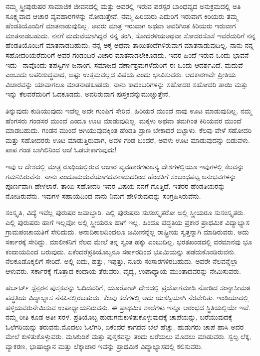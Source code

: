 ನಮ್ಮ ಸ್ತ್ರೀಪುರುಷರ ಸಾಮಾಜಿಕ ಜೀವನದಲ್ಲಿ ಮತ್ತು ಅವರಲ್ಲಿ ಇರುವ ಪರಸ್ಪರ ಬಾಂಧವ್ಯದ ಅನುಕ್ರಮದಲ್ಲಿ ಅತಿ ಸೂಕ್ಷ್ಮವಾದ ಆಚಾರ ವ್ಯವಹಾರಗಳನ್ನು ನೋಡುತ್ತೇವೆ. ನಮ್ಮ ಹಿರಿಯರು ಎದುರಿಗೆ ಇರುವಾಗ ಕಿರಿಯರು ತಮ್ಮ ಹೆಂಡತಿಯೊಂದಿಗೆ ಮಾತನಾಡುವುದಿಲ್ಲ. ಅವರು ಮಾತ್ರ ಇರುವಾಗ ಅಥವಾ ಅವರಿಗಿಂತ ಕಿರಿಯರು ಇರುವಾಗ ಮಾತನಾಡಬಹುದು. ನನಗೆ ಮದುವೆಯಾಗಿದ್ದರೆ ನನ್ನ ತಂಗಿ, ಸೋದರಳಿಯ\break ಅಥವಾ ಸೋದರಸೊಸೆ ಇವರೆದುರಿಗೆ ನನ್ನ ಹೆಂಡತಿಯೊಂದಿಗೆ ಮಾತನಾಡಬಹುದು; ನನ್ನ ಅಕ್ಕ ಅಥವಾ ತಾಯಿತಂದೆಗಳಿರುವಾಗ ಮಾತನಾಡುವುದಿಲ್ಲ. ನಾನು ನನ್ನ ಸಹೋದರಿಯರೆದುರಿಗೆ ಅವರ ಗಂಡಂದಿರ ವಿಚಾರ ಮಾತನಾಡಲೇಕೂಡದು. ಇದರ ಹಿಂದೆ ಇರುವ ಒಂದು ಭಾವನೆ ಇದು– ನಾವೊಂದು ತಪಸ್ವಿಗಳ ಜನಾಂಗ, ಸಮಾಜದ ವರ್ಣಾಶ್ರಮ\-ಗಳೆದುರಿಗೆ ಈ ಒಂದು ಆದರ್ಶವಿದೆ. ಮದುವೆ ಎಂಬುದು ಅಪರಿಶುದ್ಧವಾದ, ಅಷ್ಟು ಉತ್ತಮವಲ್ಲದ ವಿಷಯ ಎಂದು ಭಾವಿಸುವರು. ಆದಕಾರಣವೇ ಪ್ರೀತಿಯ ವಿಚಾರವನ್ನು ಯಾವಾಗಲೂ ಮಾತನಾಡಕೂಡದು. ನಾನು ಕಾದಂಬರಿಗಳನ್ನು ಸಹೋದರ ಸಹೋದರಿ ತಾಯಿ ಮತ್ತು ಇನ್ನು ಕೆಲವರೆದುರಿಗೆ ಓದಕೂಡದು. ಅವರಿರುವಾಗ ಪುಸ್ತಕವನ್ನು\break ಮುಚ್ಚುತ್ತೇನೆ.

ತಿನ್ನುವುದು ಕುಡಿಯುವುದು ಇವೆಲ್ಲ ಅದೇ ಗುಂಪಿಗೆ ಸೇರಿವೆ. ಹಿರಿಯರ ಮುಂದೆ ನಾವು ಊಟ ಮಾಡುವುದಿಲ್ಲ. ನಮ್ಮ ಹೆಂಗಸರು ಗಂಡಸರ ಮುಂದೆ ಎಂದೂ ಊಟ ಮಾಡುವುದಿಲ್ಲ. ಮಕ್ಕಳು ಅಥವಾ ತಮಗಿಂತ ಕಿರಿಯವರ ಮುಂದೆ ಮಾಡಬಹುದು. ಗಂಡನ ಮುಂದೆ ಅಗಿಯುವುದಕ್ಕಿಂತ ಹೆಂಡತಿ ಪ್ರಾಣ ಬೇಕಾದರೆ ಬಿಟ್ಟಾಳು. ಕೆಲವು ವೇಳೆ ಸಹೋದರಿ ಮತ್ತು ಸಹೋದರರು ಊಟ ಮಾಡುತ್ತಿರುವಾಗ, ಅವಳ ಗಂಡ ಬಂದರೆ, ಅವಳು ಊಟ ಮಾಡುವುದನ್ನು ಬಿಡುವಳು. ಪಾಪ ಗಂಡ ಬಾಗಿಲಿನಿಂದ ಆಚೆ ಓಡಬೇಕಾಗುವುದು!

ಇವು ಆ ದೇಶದಲ್ಲಿ ಮಾತ್ರ ರೂಢಿಯಲ್ಲಿರುವ ಆಚಾರ ವ್ಯವಹಾರಗಳು\break ಅನ್ಯ ದೇಶಗಳಲ್ಲಿಯೂ ಇವುಗಳಲ್ಲಿ ಕೆಲವನ್ನು ಗಮನಿಸಿರುವೆನು. ನಾನು ಎಂದೂ\break ಮದುವೆಯಾಗದವನಾದುದರಿಂದ ಹೆಂಡತಿಗೆ ಸಂಬಂಧಪಟ್ಟ ಅನುಭವಗಳನ್ನು ಪೂರ್ಣವಾಗಿ ಹೇಳಲಾರೆ. ತಾಯಿ ಸಹೋದರಿ ಇವರ ವಿಷಯ ನನಗೆ ಗೊತ್ತಿದೆ. ಇತರರ ಹೆಂಡತಿಯರನ್ನು ನೋಡಿರುವೆನು. ಇವುಗಳ ಸಹಾಯದಿಂದ ನಾನು ನಿಮಗೆ ಹೇಳಿರುವುದನ್ನು ಸಂಗ್ರಹಿಸಿರುವೆನು.

ಸಂಸ್ಕೃತಿ, ವಿದ್ಯೆ ಇವೆಲ್ಲ ಪುರುಷರ ಜವಾಬ್ದಾರಿ. ಎಲ್ಲಿ ಪುರುಷರು ಸುಸಂಸ್ಕೃತರೋ ಅಲ್ಲಿ ಸ್ತ್ರೀಯರೂ ಸುಸಂಸ್ಕೃತರು. ಎಲ್ಲಿ ಪುರುಷರು ಹಾಗೆ ಇಲ್ಲವೋ ಅಲ್ಲಿ ಸ್ತ್ರೀಯರೂ ಹಾಗೆ ಇಲ್ಲ. ಹಿಂದೂ ಪದ್ಧತಿಯ ಪ್ರಕಾರ ಪ್ರಾಥಮಿಕ ವಿದ್ಯಾಭ್ಯಾಸ ಗ್ರಾಮಪಂಚಾಯತಿಗೆ ಸೇರಿದುದು. ಅನಾದಿಕಾಲದಿಂದಲೂ ಜಮೀನನ್ನೆಲ್ಲ ರಾಷ್ಟ್ರೀಯ ಸ್ವತ್ತನ್ನಾಗಿ ಮಾಡಿರುವರು. ಅದು ಸರ್ಕಾರಕ್ಕೆ ಸೇರಿದ್ದು. ಮಾಲೀಕನಿಗೆ ನೆಲದ ಮೇಲೆ ತನ್ನ ಸ್ವಂತ ಹಕ್ಕು ಎಂಬುದಿಲ್ಲ. ಭರತಖಂಡದಲ್ಲಿ ವರಮಾನವು ಭೂ ಕಂದಾಯದಿಂದ ಬರುವುದು. ಏಕೆಂದರೆ\break ಪ್ರತಿಯೊಬ್ಬನೂ ಸರ್ಕಾರದಿಂದ ಭೂಮಿಯನ್ನು ಪಡೆದುಕೊಂಡಿರುವನು. ನೆಲ\break ಕೂಡೊಕ್ಕಲಿಗೆ ಸೇರಿದೆ. ಅಲ್ಲಿ ಐದು, ಹತ್ತು, ಇಪ್ಪತ್ತು, ನೂರು ಸಂಸಾರಗಳಿರಬಹುದು. ಅವರೇ ನೆಲವನ್ನೆಲ್ಲಾ ಆಳುವರು. ಸರ್ಕಾರಕ್ಕೆ ಗೊತ್ತಾದ ಕಂದಾಯ ತೆರುವರು, ವೈದ್ಯ, ಉಪಾಧ್ಯಾಯ ಮುಂತಾದವರನ್ನು ನೇಮಿಸುವರು.

ಹರ್ಬರ್ಟ್​ ಸ್ಪೆನ್ಸರನ ಪುಸ್ತಕವನ್ನು ಓದಿದವರಿಗೆ, ಯೂರೋಪ್​ ದೇಶದಲ್ಲಿ ಪ್ರಯೋಗಮಾಡಿ ನೋಡಿದ ಸಂನ್ಯಾಸೀಮಠ ಪದ್ಧತಿಯ ವಿದ್ಯಾಭ್ಯಾಸ ನೆನಪಿನಲ್ಲಿರಬಹುದು. ಕೆಲವು ಕಡೆಗಳಲ್ಲಿ ಅದು ಯಶಸ್ವಿಯಾಗಿ ನೆರವೇರಿತು. ಇಂಡಿಯಾದಲ್ಲಿ ಹಳ್ಳಿಯವರು\break ನೇಮಿಸುವ ಉಪಾಧ್ಯಾಯನಿರುವನು. ಈ ಪ್ರಾಥಮಿಕ ಶಾಲೆಗಳು ಇನ್ನೂ ಆರಂಭದ ಸ್ಥಿತಿಯಲ್ಲಿಯೇ ಇವೆ. ನಮ್ಮ ರೀತಿ ಕೂಡ ಅತೀ ಸರಳ. ಪ್ರತಿಯೊಬ್ಬ ಹುಡುಗನು\break ಕುಳಿತುಕೊಳ್ಳುವುದಕ್ಕೆ ಚಾಪೆಯನ್ನು, ಬರೆಯುವುದಕ್ಕೆ ಓಲೆಗರಿಯನ್ನು ತರುವನು.\break ಮೊದಲು ಓಲೆಗರಿ, ಏಕೆಂದರೆ ಕಾಗದದ ಬೆಲೆ ಹೆಚ್ಚು. ಹುಡುಗರು ಚಾಪೆ ಹಾಸಿ ಅದರ ಮೇಲೆ ಕುಳಿತುಕೊಳ್ಳುವರು. ಮಸಿಕುಡಿಕೆ ಮತ್ತು ಪುಸ್ತಕವನ್ನು ತಂದು ಬರೆಯಲು ಮೊದಲು ಮಾಡುವರು. ಸ್ವಲ್ಪ ಲೆಕ್ಕ, ವ್ಯಾಕರಣ, ಭಾಷಾಜ್ಞಾನ ಮತ್ತು ಲೆಕ್ಕಾಚಾರ ಇವನ್ನು ಪ್ರಾಥಮಿಕ ವಿದ್ಯಾಭ್ಯಾಸದಲ್ಲಿ ಕಲಿಸುವರು.

